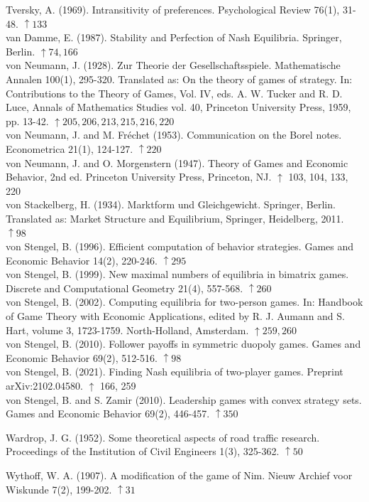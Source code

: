 \documentclass[12pt]{article}
\begin{document}
Tversky, A. (1969). Intransitivity of preferences. Psychological Review 76(1), 31-48. $\uparrow 133$\\
van Damme, E. (1987). Stability and Perfection of Nash Equilibria. Springer, Berlin. $\uparrow 74,166$\\
von Neumann, J. (1928). Zur Theorie der Gesellschaftsspiele. Mathematische Annalen 100(1), 295-320. Translated as: On the theory of games of strategy. In: Contributions to the Theory of Games, Vol. IV, eds. A. W. Tucker and R. D. Luce, Annals of Mathematics Studies vol. 40, Princeton University Press, 1959, pp. 13-42. $\uparrow 205,206,213,215,216,220$\\
von Neumann, J. and M. Fréchet (1953). Communication on the Borel notes. Econometrica 21(1), 124-127. $\uparrow 220$\\
von Neumann, J. and O. Morgenstern (1947). Theory of Games and Economic Behavior, 2nd ed. Princeton University Press, Princeton, NJ. $\uparrow$ 103, 104, 133, 220\\
von Stackelberg, H. (1934). Marktform und Gleichgewicht. Springer, Berlin. Translated as: Market Structure and Equilibrium, Springer, Heidelberg, 2011. $\uparrow 98$\\
von Stengel, B. (1996). Efficient computation of behavior strategies. Games and Economic Behavior 14(2), 220-246. $\uparrow 295$\\
von Stengel, B. (1999). New maximal numbers of equilibria in bimatrix games. Discrete and Computational Geometry 21(4), 557-568. $\uparrow 260$\\
von Stengel, B. (2002). Computing equilibria for two-person games. In: Handbook of Game Theory with Economic Applications, edited by R. J. Aumann and S. Hart, volume 3, 1723-1759. North-Holland, Amsterdam. $\uparrow 259,260$\\
von Stengel, B. (2010). Follower payoffs in symmetric duopoly games. Games and Economic Behavior 69(2), 512-516. $\uparrow 98$\\
von Stengel, B. (2021). Finding Nash equilibria of two-player games. Preprint arXiv:2102.04580. $\uparrow$ 166, 259\\
von Stengel, B. and S. Zamir (2010). Leadership games with convex strategy sets. Games and Economic Behavior 69(2), 446-457. $\uparrow 350$

Wardrop, J. G. (1952). Some theoretical aspects of road traffic research. Proceedings of the Institution of Civil Engineers 1(3), 325-362. $\uparrow 50$

Wythoff, W. A. (1907). A modification of the game of Nim. Nieuw Archief voor Wiskunde 7(2), 199-202. $\uparrow 31$
\end{document}
